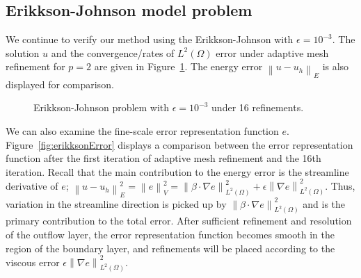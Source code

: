\documentclass[final,leqno]{siamltex}
\newcommand{\nor}[1]{\left\| #1 \right\|}
\newcommand{\LRp}[1]{\left( #1 \right)}
\newcommand{\Grad} {\ensuremath{\nabla}}
\renewcommand{\L}{L^2\LRp{\Omega}}
\begin{document}
\subsection{Erikkson-Johnson model problem}

We continue to verify our method using the Erikkson-Johnson with $\epsilon = 10^{-3}$.  The solution $u$ and the convergence/rates of $\L$ error under adaptive mesh refinement for $p=2$ are given in Figure~\ref{fig:erikksonAdapt}.  The energy error $\nor{u-u_h}_E$ is also displayed for comparison.  
\begin{figure}[!h]
\centering
{}
\caption{Erikkson-Johnson problem with $\epsilon = 10^{-3}$ under 16 refinements.}
\label{fig:erikksonAdapt}
\end{figure}

We can also examine the fine-scale error representation function $e$.  Figure~\ref{fig:erikksonError} displays a comparison between the error representation function after the first iteration of adaptive mesh refinement and the 16th iteration.  Recall that the main contribution to the energy error is the streamline derivative of $e$; $\nor{u-u_h}_E^2 = \nor{e}_V^2 = \nor{\beta \cdot \Grad e}_{\L}^2 + \epsilon\nor{\Grad e}_{\L}^2$. Thus, variation in the streamline direction is picked up by $\nor{\beta\cdot \Grad e}_{\L}^2$ and is the primary contribution to the total error.  After sufficient refinement and resolution of the outflow layer, the error representation function becomes smooth in the region of the boundary layer, and refinements will be placed according to the viscous error $\epsilon\nor{\Grad e}_{\L}^2$. 
\end{document}
